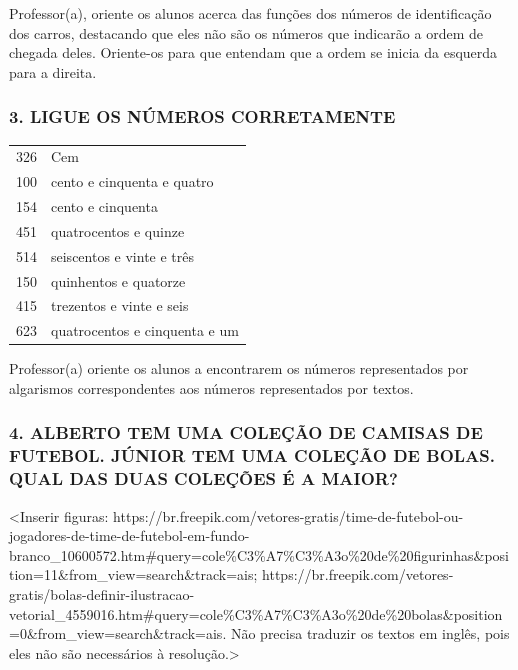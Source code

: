 Professor(a), oriente os alunos acerca das funções dos números de
identificação dos carros, destacando que eles não são os números que
indicarão a ordem de chegada deles. Oriente-os para que entendam que a
ordem se inicia da esquerda para a direita.

\subsubsection{3. LIGUE OS NÚMEROS CORRETAMENTE
}\label{ligue-os-nuxfameros-corretamente}

\begin{longtable}[]{@{}ll@{}}
\toprule
326 & Cem\tabularnewline
100 & cento e cinquenta e quatro\tabularnewline
154 & cento e cinquenta\tabularnewline
451 & quatrocentos e quinze\tabularnewline
514 & seiscentos e vinte e três\tabularnewline
150 & quinhentos e quatorze\tabularnewline
415 & trezentos e vinte e seis\tabularnewline
623 & quatrocentos e cinquenta e um\tabularnewline
\bottomrule
\end{longtable}

Professor(a) oriente os alunos a encontrarem os números representados
por algarismos correspondentes aos números representados por textos.

\subsubsection{4. ALBERTO TEM UMA COLEÇÃO DE CAMISAS DE FUTEBOL. JÚNIOR
TEM UMA COLEÇÃO DE BOLAS. QUAL DAS DUAS COLEÇÕES É A MAIOR?
}\label{alberto-tem-uma-coleuxe7uxe3o-de-camisas-de-futebol.-juxfanior-tem-uma-coleuxe7uxe3o-de-bolas.-qual-das-duas-coleuxe7uxf5es-uxe9-a-maior}

\textless{}Inserir figuras:
https://br.freepik.com/vetores-gratis/time-de-futebol-ou-jogadores-de-time-de-futebol-em-fundo-branco\_10600572.htm\#query=cole\%C3\%A7\%C3\%A3o\%20de\%20figurinhas\&position=11\&from\_view=search\&track=ais;
https://br.freepik.com/vetores-gratis/bolas-definir-ilustracao-vetorial\_4559016.htm\#query=cole\%C3\%A7\%C3\%A3o\%20de\%20bolas\&position=0\&from\_view=search\&track=ais.
Não precisa traduzir os textos em inglês, pois eles não são necessários
à resolução.\textgreater{}


